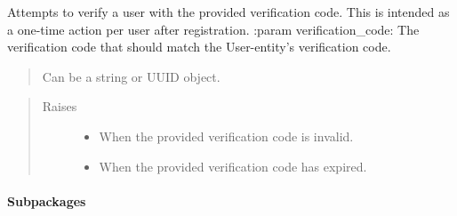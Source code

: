 \documentclass[letterpaper,10pt,english]{sphinxmanual}
\begin{document}
\begin{fulllineitems}
\begin{quote}
\begin{description}
\end{description}\end{quote}

\end{fulllineitems}


\begin{fulllineitems}
\label{\detokenize{pydash_app.user:pydash_app.user.verify}}
Attempts to verify a user with the provided verification code.
This is intended as a one-time action per user after registration.
:param verification\_code: The verification code that should match the User-entity’s verification code.
\begin{quote}

Can be a string or UUID object.
\end{quote}
\begin{quote}\begin{description}
\item[{Raises}] \leavevmode\begin{itemize}
\item {} 
{\hyperref[\detokenize{pydash_app.user.verification:pydash_app.user.verification.InvalidVerificationCodeError}]{}} \textendash{} When the provided verification code is invalid.

\item {} 
{\hyperref[\detokenize{pydash_app.user.verification:pydash_app.user.verification.VerificationCodeExpiredError}]{}} \textendash{} When the provided verification code has expired.

\end{itemize}

\end{description}\end{quote}

\end{fulllineitems}



\paragraph{Subpackages}
\label{\detokenize{pydash_app.user:subpackages}}
\end{document}
